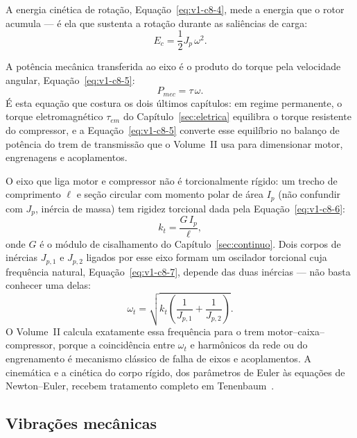 \documentclass[12pt,a4paper]{article}
\numberwithin{equation}{section}
\numberwithin{table}{section}
\numberwithin{figure}{section}
\begin{document}
A energia cinética de rotação, Equação~\eqref{eq:v1-c8-4}, mede a energia que
o rotor acumula --- é ela que sustenta a rotação durante as saliências de
carga:
\begin{equation}\label{eq:v1-c8-4}
E_c = \frac{1}{2} J_p \,\omega^2.
\end{equation}

A potência mecânica transferida ao eixo é o produto do torque pela velocidade
angular, Equação~\eqref{eq:v1-c8-5}:
\begin{equation}\label{eq:v1-c8-5}
P_{mec} = \tau\,\omega.
\end{equation}
É esta equação que costura os dois últimos capítulos: em regime permanente, o
torque eletromagnético $\tau_{em}$ do Capítulo~\ref{sec:eletrica} equilibra o
torque resistente do compressor, e a Equação~\eqref{eq:v1-c8-5} converte esse
equilíbrio no balanço de potência do trem de transmissão que o Volume~II usa
para dimensionar motor, engrenagens e acoplamentos.

O eixo que liga motor e compressor não é torcionalmente rígido: um trecho de
comprimento $\ell$ e seção circular com momento polar de área $I_p$ (não
confundir com $J_p$, inércia de massa) tem rigidez torcional dada pela
Equação~\eqref{eq:v1-c8-6}:
\begin{equation}\label{eq:v1-c8-6}
k_t = \frac{G\,I_p}{\ell},
\end{equation}
onde $G$ é o módulo de cisalhamento do Capítulo~\ref{sec:continuo}. Dois
corpos de inércias $J_{p,1}$ e $J_{p,2}$ ligados por esse eixo formam um
oscilador torcional cuja frequência natural, Equação~\eqref{eq:v1-c8-7},
depende das duas inércias --- não basta conhecer uma delas:
\begin{equation}\label{eq:v1-c8-7}
\omega_{t} = \sqrt{k_t\left(\frac{1}{J_{p,1}} + \frac{1}{J_{p,2}}\right)}.
\end{equation}
O Volume~II calcula exatamente essa frequência para o trem
motor--caixa--compressor, porque a coincidência entre $\omega_t$ e harmônicos
da rede ou do engrenamento é mecanismo clássico de falha de eixos e
acoplamentos. A cinemática e a cinética do corpo rígido, dos parâmetros de
Euler às equações de Newton--Euler, recebem tratamento completo em
Tenenbaum~\cite{tenenbaum1997}.

\subsection{Vibrações mecânicas}\label{sub:v1-c8-vibracoes}
\end{document}
